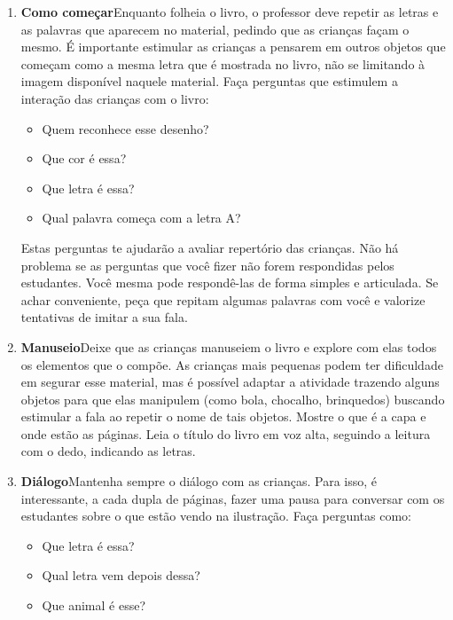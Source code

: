 \documentclass[11pt]{extarticle}
\begin{document}
\begin{enumerate}
\item \textbf{Como começar}\quad Enquanto folheia o livro, o professor deve repetir as letras e as palavras que aparecem no material, pedindo que as crianças façam o mesmo. É importante estimular as crianças a pensarem em outros objetos que começam como a mesma letra que é mostrada no livro, não se limitando à imagem disponível naquele material.
Faça perguntas que estimulem a interação das crianças com o livro:

\begin{itemize}
\item Quem reconhece esse desenho?
\item Que cor é essa?
\item Que letra é essa?
\item Qual palavra começa com a letra A?
\end{itemize}

Estas perguntas te ajudarão a avaliar repertório das crianças. 
Não há problema se as perguntas que você fizer não forem respondidas pelos 
estudantes. Você mesma pode respondê-las de forma simples e articulada. Se achar 
conveniente, peça que repitam algumas palavras com você e valorize tentativas 
de imitar a sua fala. 


 
\item \textbf{Manuseio}\quad Deixe que as crianças manuseiem o livro 
e explore com elas todos os elementos que o compõe.
As crianças mais pequenas podem ter dificuldade em segurar esse material, mas é possível adaptar a atividade trazendo alguns objetos para que elas manipulem (como bola, chocalho, brinquedos) buscando estimular a fala ao repetir o nome de tais objetos. 
Mostre o que é a 
capa e onde estão as páginas. Leia o título do livro em voz alta, seguindo 
a leitura com o dedo, indicando as letras. 

\item \textbf{Diálogo}\quad Mantenha sempre o diálogo com as crianças. Para isso, é interessante, a cada dupla de páginas, fazer uma 
pausa para conversar com os estudantes sobre o que estão vendo na ilustração. 
Faça perguntas como: 

\begin{itemize}
\item Que letra é essa?
\item Qual letra vem depois dessa?
\item Que animal é esse?
\end{itemize}


\end{enumerate}
\end{document}
